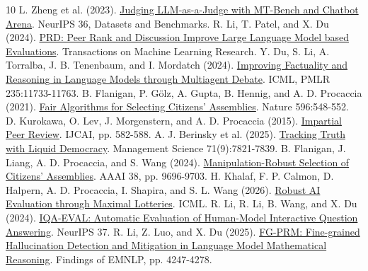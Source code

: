 \documentclass[12pt,letterpaper]{article}
\begin{document}
\clearpage
\begingroup
\small
\setlength{\parskip}{0pt}
\begin{thebibliography}{10}
\setlength{\itemsep}{5pt}
 L. Zheng et al. (2023). \href{https://papers.nips.cc/paper_files/paper/2023/hash/91f18a1287b398d378ef22505bf41832-Abstract-Datasets_and_Benchmarks.html}{Judging LLM-as-a-Judge with MT-Bench and Chatbot Arena}. NeurIPS 36, Datasets and Benchmarks.
 R. Li, T. Patel, and X. Du (2024). \href{https://openreview.net/forum?id=YVD1QqWRaj}{PRD: Peer Rank and Discussion Improve Large Language Model based Evaluations}. Transactions on Machine Learning Research.
 Y. Du, S. Li, A. Torralba, J. B. Tenenbaum, and I. Mordatch (2024). \href{https://proceedings.mlr.press/v235/du24e.html}{Improving Factuality and Reasoning in Language Models through Multiagent Debate}. ICML, PMLR 235:11733-11763.
 B. Flanigan, P. Gölz, A. Gupta, B. Hennig, and A. D. Procaccia (2021). \href{https://doi.org/10.1038/s41586-021-03788-6}{Fair Algorithms for Selecting Citizens' Assemblies}. Nature 596:548-552.
 D. Kurokawa, O. Lev, J. Morgenstern, and A. D. Procaccia (2015). \href{https://procaccia.info/wp-content/uploads/2020/03/impartial.pdf}{Impartial Peer Review}. IJCAI, pp. 582-588.
 A. J. Berinsky et al. (2025). \href{https://doi.org/10.1287/mnsc.2023.02470}{Tracking Truth with Liquid Democracy}. Management Science 71(9):7821-7839.
 B. Flanigan, J. Liang, A. D. Procaccia, and S. Wang (2024). \href{https://procaccia.info/wp-content/uploads/2023/08/sortmanip.pdf}{Manipulation-Robust Selection of Citizens' Assemblies}. AAAI 38, pp. 9696-9703.
 H. Khalaf, F. P. Calmon, D. Halpern, A. D. Procaccia, I. Shapira, and S. L. Wang (2026). \href{https://procaccia.info/wp-content/uploads/2026/01/maxlot.pdf}{Robust AI Evaluation through Maximal Lotteries}. ICML.
 R. Li, R. Li, B. Wang, and X. Du (2024). \href{https://proceedings.nips.cc/paper_files/paper/2024/hash/c6a23b26eaaefd187973658f5001f4fe-Abstract-Conference.html}{IQA-EVAL: Automatic Evaluation of Human-Model Interactive Question Answering}. NeurIPS 37.
 R. Li, Z. Luo, and X. Du (2025). \href{https://aclanthology.org/2025.findings-emnlp.228/}{FG-PRM: Fine-grained Hallucination Detection and Mitigation in Language Model Mathematical Reasoning}. Findings of EMNLP, pp. 4247-4278.
\end{thebibliography}
\endgroup
\end{document}
